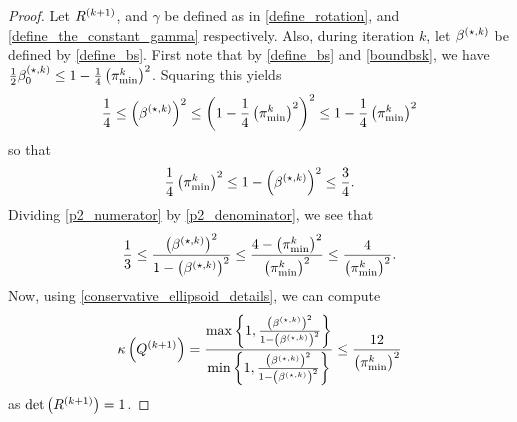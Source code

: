 \begin{proof}

Let ${R^{(k+1)}}$, and $\gamma$ be defined as in \cref{define_rotation}, and \cref{define_the_constant_gamma} respectively.
Also, during iteration $k$, let ${\beta^{(\star, k)}}$ be defined by \cref{define_bs}.
First note that by \cref{define_bs} and \cref{boundbsk}, we have
$\frac 1 2 {\beta_0^{(\star, k)}} \le 1 - \frac 1 4 \left({\pi^k_{\textrm{min}}}\right)^2$.
Squaring this yields
\begin{align}
\frac {1} 4 \le \left({\beta^{(\star, k)}}\right)^2 \le \left(1 - \frac 1 4 \left({\pi^k_{\textrm{min}}}\right)^2\right)^2 \le 1 - \frac 1 4 \left({\pi^k_{\textrm{min}}}\right)^2 \label{p2_numerator}
\end{align}
so that
\begin{align}
\frac 1 4  \left({\pi^k_{\textrm{min}}}\right)^2 \le 1 - \left({\beta^{(\star, k)}}\right)^2 \le \frac 3 4. \label{p2_denominator}
\end{align}
Dividing \cref{p2_numerator} by \cref{p2_denominator}, we see that
\begin{align*}
\frac 1 3
\le \frac{\left({\beta^{(\star, k)}}\right)^2}{1 - \left({\beta^{(\star, k)}}\right)^2}
\le \frac {4 - \left({\pi^k_{\textrm{min}}}\right)^2}{\left({\pi^k_{\textrm{min}}}\right)^2} \le \frac {4}{\left({\pi^k_{\textrm{min}}}\right)^2}.
\end{align*}
Now, using \cref{conservative_ellipsoid_details}, we can compute 
\begin{align*}
{\kappa} \left({Q^{(k+1)}}\right) 
= \frac{\max\left\{1, \frac{\left({\beta^{(\star, k)}}\right)^2}{1 - \left({\beta^{(\star, k)}}\right)^2}\right\}}{\min\left\{1, \frac{\left({\beta^{(\star, k)}}\right)^2}{1 - \left({\beta^{(\star, k)}}\right)^2}\right\}} 
\le \frac {12}{\left({\pi^k_{\textrm{min}}}\right)^2}
\end{align*}
as $\det\left({R^{(k+1)}}\right) = 1$.
\end{proof}




\begin{lemma}
\label[lemma]{cone_subset_cone}

Given $u, v \in \Rn$, and $\gamma \in (0, 1]$, $\beta \in [0, \gamma)$ that satisfy $\|u\| = \|v\|= 1$, $u^Tv = \gamma$, define
\begin{align*}
B = \{x\in\Rn | {v}^Tx \ge \beta\|x\|\}, \quad
S = \left\{x\in\Rn \bigg| u^Tx \ge \left(\beta\gamma + \sqrt{(1 - \beta^2)\left(1 - \gamma^2\right)}\right)\|x\| \right\}. 
\end{align*}
Then, $S \subseteq B$.
\end{lemma}


